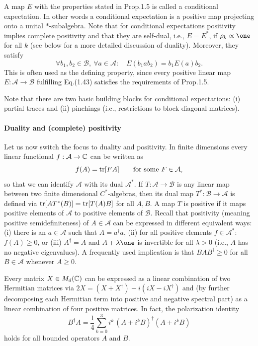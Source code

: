 \documentclass[11pt,a4paper]{article}
\theoremstyle{plain}
\theoremstyle{definition}
\theoremstyle{remark}
\numberwithin{equation}{section}
\begin{document}
A map $E$ with the properties stated in Prop.1.5 is called a conditional expectation. In other words a conditional expectation is a positive map projecting onto a unital $\ast$-subalgebra. Note that for conditional expectations positivity implies complete positivity and that they are self-dual, i.e., $E=E^\ast$, if $\rho_k\propto \one$ for all $k$ (see below for a more detailed discussion of duality). Moreover, they satisfy
\begin{equation}
    \forall b_1,b_2\in \mathcal{B},\ \forall a\in \mathcal{A}:\quad
    E(b_1ab_2)=b_1E(a)b_2.
\end{equation}
This is often used as the defining property, since every positive linear map $E:\mathcal{A}\to \mathcal{B}$ fulfilling Eq.(1.43) satisfies the requirements of Prop.1.5.

Note that there are two basic building blocks for conditional expectations: (i) partial traces and (ii) pinchings (i.e., restrictions to block diagonal matrices).

\paragraph{Duality and (complete) positivity}
Let us now switch the focus to duality and positivity. In finite dimensions every linear functional $f:\mathcal{A}\to \mathbb{C}$ can be written as
\begin{equation}
    f(A)=\operatorname{tr}[FA]\qquad\text{for some }F\in \mathcal{A},
\end{equation}
so that we can identify $\mathcal{A}$ with its dual $\mathcal{A}^\ast$. If $T:\mathcal{A}\to \mathcal{B}$ is any linear map between two finite dimensional $C^\ast$-algebras, then its dual map $T^\ast:\mathcal{B}\to \mathcal{A}$ is defined via $\operatorname{tr}[AT^\ast(B)]=\operatorname{tr}[T(A)B]$ for all $A,B$. A map $T$ is positive if it maps positive elements of $\mathcal{A}$ to positive elements of $\mathcal{B}$. Recall that positivity (meaning positive semidefiniteness) of $A\in \mathcal{A}$ can be expressed in different equivalent ways: (i) there is an $a\in \mathcal{A}$ such that $A=a^\dagger a$, (ii) for all positive elements $f\in \mathcal{A}^\ast$: $f(A)\ge 0$, or (iii) $A^\dagger=A$ and $A+\lambda\one$ is invertible for all $\lambda>0$ (i.e., $A$ has no negative eigenvalues). A frequently used implication is that $BAB^\dagger\ge 0$ for all $B\in \mathcal{A}$ whenever $A\ge 0$.

Every matrix $X\in M_d(\mathbb{C})$ can be expressed as a linear combination of two Hermitian matrices via $2X=(X+X^\dagger)-i(iX-iX^\dagger)$ and (by further decomposing each Hermitian term into positive and negative spectral part) as a linear combination of four positive matrices. In fact, the polarization identity
\begin{equation}
    B^\dagger A =
    \frac{1}{4}\sum_{k=0}^{3} i^k\,(A+i^kB)^\dagger(A+i^kB)
\end{equation}
holds for all bounded operators $A$ and $B$.
\end{document}
